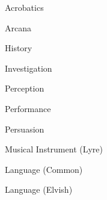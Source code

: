 \documentclass[11pt]{article}
\begin{document}
\begin{charsheet}
  
\begin{proficiencies}[right of upper corner=of stats background,width=38mm]
  \small
\item
  {Acrobatics}
\item
  Arcana
\item
  History
\item
  Investigation
\item
  Perception
\item
  Performance
\item
  Persuasion
\item
  Musical Instrument (Lyre)
\item
  Language (Common)
\item
  Language (Elvish)
\end{proficiencies}

\end{charsheet}
\end{document}
